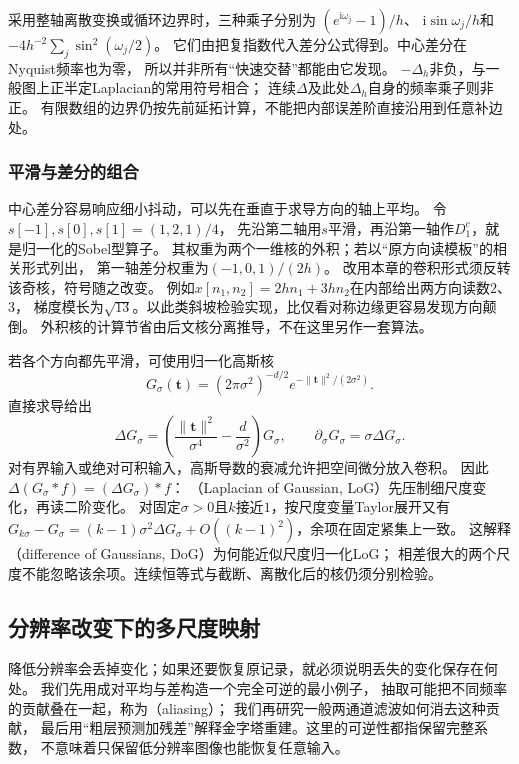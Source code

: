 采用整轴离散变换或循环边界时，三种乘子分别为
$(e^{\mathrm i\omega_j}-1)/h$、
$\mathrm i\sin\omega_j/h$和
$-4h^{-2}\sum_j\sin^2(\omega_j/2)$。
它们由把复指数代入差分公式得到。中心差分在Nyquist频率也为零，
所以并非所有“快速交替”都能由它发现。
$-\Delta_h$非负，与一般图上正半定Laplacian的常用符号相合；
连续$\Delta$及此处$\Delta_h$自身的频率乘子则非正。
有限数组的边界仍按先前延拓计算，不能把内部误差阶直接沿用到任意补边处。

\subsubsection{平滑与差分的组合}
中心差分容易响应细小抖动，可以先在垂直于求导方向的轴上平均。
令$s[-1],s[0],s[1]=(1,2,1)/4$，
先沿第二轴用$s$平滑，再沿第一轴作$D_1^c$，就是归一化的Sobel型算子。
其权重为两个一维核的外积；若以“原方向读模板”的相关形式列出，
第一轴差分权重为$(-1,0,1)/(2h)$。
改用本章的卷积形式须反转该奇核，符号随之改变。
例如$x[n_1,n_2]=2hn_1+3hn_2$在内部给出两方向读数$2$、$3$，
梯度模长为$\sqrt{13}$。以此类斜坡检验实现，比仅看对称边缘更容易发现方向颠倒。
外积核的计算节省由后文核分离推导，不在这里另作一套算法。

若各个方向都先平滑，可使用归一化高斯核
\[
 G_\sigma(\bm t)=(2\pi\sigma^2)^{-d/2}
 e^{-\|\bm t\|^2/(2\sigma^2)}.
\]
直接求导给出
\[
 \Delta G_\sigma=
 \left(\frac{\|\bm t\|^2}{\sigma^4}-\frac d{\sigma^2}\right)G_\sigma,
 \qquad \partial_\sigma G_\sigma=\sigma\Delta G_\sigma .
\]
对有界输入或绝对可积输入，高斯导数的衰减允许把空间微分放入卷积。
因此$\Delta(G_\sigma*f)=(\Delta G_\sigma)*f$：
（Laplacian of Gaussian, LoG）先压制细尺度变化，再读二阶变化。
对固定$\sigma>0$且$k$接近$1$，按尺度变量Taylor展开又有
$G_{k\sigma}-G_\sigma=(k-1)\sigma^2\Delta G_\sigma+
O((k-1)^2)$，余项在固定紧集上一致。
这解释（difference of Gaussians, DoG）为何能近似尺度归一化LoG；
相差很大的两个尺度不能忽略该余项。连续恒等式与截断、离散化后的核仍须分别检验。

\subsection{分辨率改变下的多尺度映射}
\label{sec:signal-multiscale-maps}

降低分辨率会丢掉变化；如果还要恢复原记录，就必须说明丢失的变化保存在何处。
我们先用成对平均与差构造一个完全可逆的最小例子，
抽取可能把不同频率的贡献叠在一起，称为（aliasing）；
我们再研究一般两通道滤波如何消去这种贡献，
最后用“粗层预测加残差”解释金字塔重建。这里的可逆性都指保留完整系数，
不意味着只保留低分辨率图像也能恢复任意输入。

